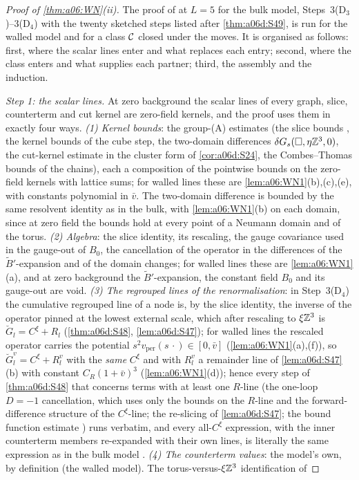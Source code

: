 
\begin{proof}[Proof of \cref{thm:a06:WN}\textup{(ii)}]
The proof of \cite[(1.33)]{Ba3} at $L=5$ for the bulk model, Steps~3(D$_3$)--3(D$_4$) with the twenty sketched steps listed after \cref{thm:a06d:S49}, is run for the walled model and for a class $\mathcal C$ closed under the moves. It is organised as follows: first, where the scalar lines enter and what replaces each entry; second, where the class enters and what supplies each partner; third, the assembly and the induction.

\emph{Step 1: the scalar lines.} At zero background the scalar lines of every graph, slice, counterterm and cut kernel are zero-field kernels, and the proof uses them in exactly four ways. \emph{(1) Kernel bounds}: the group-(A) estimates (the slice bounds \cite[(2.6), (2.10)--(2.12)]{Ba3}, the kernel bounds of the cube step, the two-domain differences $\delta G_s(\square,\eta\mathbb Z^3,0)$, the cut-kernel estimate \cite[(3.1)]{Ba3} in the cluster form of \cref{cor:a06d:S24}, the Combes--Thomas bounds of the chains), each a composition of the pointwise bounds on the zero-field kernels with lattice sums; for walled lines these are \cref{lem:a06:WN1}(b),(c),(e), with constants polynomial in $\bar v$. The two-domain difference is bounded by the same resolvent identity as in the bulk, with \cref{lem:a06:WN1}(b) on each domain, since at zero field the bounds hold at every point of a Neumann domain and of the torus. \emph{(2) Algebra}: the slice identity, its rescaling, the gauge covariance used in the gauge-out of $B_0$, the cancellation of the operator in the differences of the $\tilde B'$-expansion and of the domain changes; for walled lines these are \cref{lem:a06:WN1}(a), and at zero background the $\tilde B'$-expansion, the constant field $B_0$ and its gauge-out are void. \emph{(3) The regrouped lines of the renormalisation}: in Step~3(D$_4$) the cumulative regrouped line of a node is, by the slice identity, the inverse of the operator pinned at the lowest external scale, which after rescaling to $\xi\mathbb Z^3$ is $\breve G_l=C^\xi+R_l$ (\cref{thm:a06d:S48}, \cref{lem:a06d:S47}); for walled lines the rescaled operator carries the potential $s^2v_{\mathrm{per}}(s\,\cdot)\in[0,\bar v]$ (\cref{lem:a06:WN1}(a),(f)), so $\breve G^v_l=C^\xi+R^v_l$ with the \emph{same} $C^\xi$ and with $R^v_l$ a remainder line of \cref{lem:a06d:S47}(b) with constant $C_R(1+\bar v)^3$ (\cref{lem:a06:WN1}(d)); hence every step of \cref{thm:a06d:S48} that concerns terms with at least one $R$-line (the one-loop $D=-1$ cancellation, which uses only the bounds on the $R$-line and the forward-difference structure of the $C^\xi$-line; the re-slicing of \cref{lem:a06d:S47}; the bound function estimate \cite[(2.16)]{Ba3}) runs verbatim, and every all-$C^\xi$ expression, with the inner counterterm members re-expanded with their own lines, is literally the same expression as in the bulk model \cite[pp.~437, 441]{Ba3}. \emph{(4) The counterterm values}: the model's own, by definition (the walled model). The torus-versus-$\xi\mathbb Z^3$ identification of 
\end{proof}

